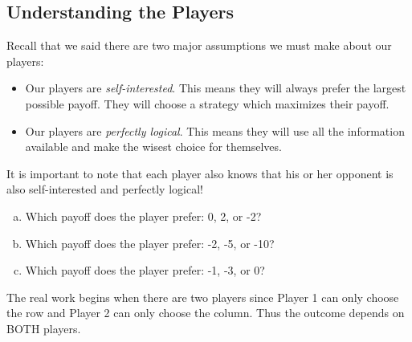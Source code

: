 
\subsection{Understanding the Players}


\vspace{.2in}


Recall that we said there are two major assumptions we must make about our players:
\begin{itemize}
\item Our players are \emph{self-interested}. This means they will always prefer the largest  possible payoff. They will choose a strategy which maximizes their payoff.
\item Our players are \emph{perfectly logical}. This means they will use all the information available and make the wisest choice for themselves.
\end{itemize}
It is important to note that each player also knows that his or her opponent is also self-interested and perfectly logical!

\begin{xca}
\begin{enumerate}[(a)]
\item Which payoff does the player prefer: 0, 2, or -2?
\item Which payoff does the player prefer: -2, -5, or -10?
\item Which payoff does the player prefer: -1, -3, or 0?
\end{enumerate}
\end{xca}
\vspace{.1in}

The real work begins when there are two players since Player 1 can only choose the row and Player 2 can only choose the column. Thus the outcome depends on BOTH players. 



